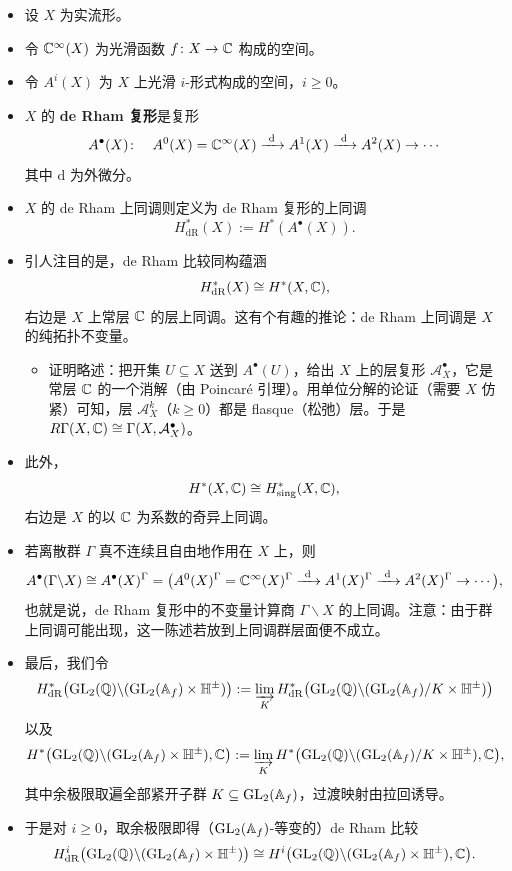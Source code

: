 \begin{itemize}
\item 设 $X$ 为实流形。
\item 令 $\mathbb{C}^\infty(X)$ 为光滑函数 $f\colon X\to\mathbb{C}$ 构成的空间。
\item 令 $A^i(X)$ 为 $X$ 上光滑 $i$-形式构成的空间，$i\ge0$。
\item $X$ 的 \textbf{de Rham 复形}是复形
\[
A^\bullet(X)\colon\quad A^0(X)=\C^\infty(X)\xrightarrow{\ \mathrm{d}\ }A^1(X)\xrightarrow{\ \mathrm{d}\ }A^2(X)\to\cdots
\]
其中 $\mathrm{d}$ 为外微分。
\item $X$ 的 de Rham 上同调则定义为 de Rham 复形的上同调
\[
H^*_{\mathrm{dR}}(X):=H^*(A^\bullet(X)).
\]
\item 引人注目的是，de Rham 比较同构蕴涵
\[
H^*_{\mathrm{dR}}(X)\cong H^*(X,\mathbb{C}),
\]
右边是 $X$ 上常层 $\mathbb{C}$ 的层上同调。这有个有趣的推论：de Rham 上同调是 $X$ 的纯拓扑不变量。
\begin{itemize}
\item 证明略述：把开集 $U\subseteq X$ 送到 $A^\bullet(U)$，给出 $X$ 上的层复形 $\mathcal A^\bullet_X$，它是常层 $\mathbb{C}$ 的一个消解（由 Poincaré 引理）。用单位分解的论证（需要 $X$ 仿紧）可知，层 $\mathcal A^k_X$（$k\ge0$）都是 flasque（松弛）层。于是 $R\Gamma(X,\mathbb{C})\cong\Gamma(X,\mathcal A^\bullet_X)$。
\end{itemize}
\item 此外，
\[
H^*(X,\mathbb{C})\cong H^*_{\mathrm{sing}}(X,\mathbb{C}),
\]
右边是 $X$ 的以 $\mathbb{C}$ 为系数的奇异上同调。
\item 若离散群 $\Gamma$ 真不连续且自由地作用在 $X$ 上，则
\[
A^\bullet(\Gamma\backslash X)\cong A^\bullet(X)^\Gamma=\bigl(A^0(X)^\Gamma=\C^\infty(X)^\Gamma\xrightarrow{\ \mathrm{d}\ }A^1(X)^\Gamma\xrightarrow{\ \mathrm{d}\ }A^2(X)^\Gamma\to\cdots\bigr),
\]
也就是说，de Rham 复形中的不变量计算商 $\Gamma\backslash X$ 的上同调。注意：由于群上同调可能出现，这一陈述若放到上同调群层面便不成立。

\item 最后，我们令
\[
H^*_{\mathrm{dR}}\bigl(\operatorname{GL}_2(\mathbb{Q})\backslash(\operatorname{GL}_2(\mathbb{A}_f)\times\mathbb{H}^\pm)\bigr):=\varinjlim_{K}H^*_{\mathrm{dR}}\bigl(\operatorname{GL}_2(\mathbb{Q})\backslash(\operatorname{GL}_2(\mathbb{A}_f)/K\times\mathbb{H}^\pm)\bigr)
\]
以及
\[
H^*\bigl(\operatorname{GL}_2(\mathbb{Q})\backslash(\operatorname{GL}_2(\mathbb{A}_f)\times\mathbb{H}^\pm),\mathbb{C}\bigr):=\varinjlim_{K}H^*\bigl(\operatorname{GL}_2(\mathbb{Q})\backslash(\operatorname{GL}_2(\mathbb{A}_f)/K\times\mathbb{H}^\pm),\mathbb{C}\bigr),
\]
其中余极限取遍全部紧开子群 $K\subseteq\operatorname{GL}_2(\mathbb{A}_f)$，过渡映射由拉回诱导。
\item 于是对 $i\ge0$，取余极限即得（$\operatorname{GL}_2(\mathbb{A}_f)$-等变的）de Rham 比较
\[
H^i_{\mathrm{dR}}\bigl(\operatorname{GL}_2(\mathbb{Q})\backslash(\operatorname{GL}_2(\mathbb{A}_f)\times\mathbb{H}^\pm)\bigr)\cong H^i\bigl(\operatorname{GL}_2(\mathbb{Q})\backslash(\operatorname{GL}_2(\mathbb{A}_f)\times\mathbb{H}^\pm),\mathbb{C}\bigr).
\]
\end{itemize}

